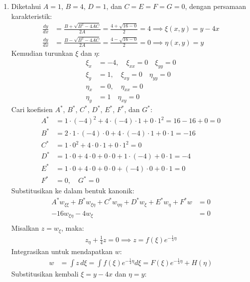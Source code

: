 \documentclass{article}
\theoremstyle{definition}
\begin{document}
\begin{enumerate}
\item Diketahui $A=1$, $B=4$, $D=1$, dan $C=E=F=G=0$, dengan persamaan karakteristik:
\begin{align*}
  \frac{dy}{dx}&=\frac{B +\sqrt{B^2 - 4AC}}{2A} = \frac{4 + \sqrt{16 - 0}}{2} = 4 \implies \xi(x,y) = y-4x \\
  \frac{dy}{dx}&=\frac{B -\sqrt{B^2 - 4AC}}{2A} = \frac{4 - \sqrt{16 - 0}}{2} = 0 \implies \eta(x,y) = y
\end{align*}
Kemudian turunkan $\xi$ dan $\eta$:
\begin{align*}
  \xi_x &= -4, \quad  \xi_{xx} = 0 \quad \xi_{yy} = 0 \\
  \xi_y &= 1, \quad  \xi_{xy} = 0 \quad \eta_{yy} = 0\\
  \eta_x &= 0, \quad \eta_{xx} = 0 \\
  \eta_y &= 1 \quad \eta_{xy} = 0
\end{align*}
Cari koefisien $A^*$, $B^*$, $C^*$, $D^*$, $E^*$, $F^*$, dan $G^*$:
\begin{align*}
A^* &= 1 \cdot (-4)^2 + 4 \cdot (-4) \cdot 1 + 0 \cdot 1^2 = 16 - 16 + 0 = 0 \\
B^* &= 2 \cdot 1 \cdot (-4) \cdot 0 + 4 \cdot (-4) \cdot 1 + 0 \cdot 1 = -16 \\
C^* &= 1 \cdot 0^2 + 4 \cdot 0 \cdot 1 + 0 \cdot 1^2 = 0 \\
D^* &= 1 \cdot 0 + 4 \cdot 0 + 0 \cdot 0 + 1 \cdot (-4) + 0 \cdot 1 = -4 \\
E^* &= 1 \cdot 0 + 4 \cdot 0 + 0 \cdot 0 + (-4) \cdot 0 + 0 \cdot 1 = 0 \\
F^* &= 0, \quad G^* = 0 
\end{align*}
Substitusikan ke dalam bentuk kanonik:
\begin{align*}
  A^* w_{\xi\xi} + B^* w_{\xi\eta} + C^* w_{\eta\eta} + D^* w_\xi + E^* w_\eta + F^* w &= 0 \\
  -16 w_{\xi\eta} - 4 w_\xi &= 0\\
\end{align*}
Misalkan $z=w_\xi$, maka:
\begin{align*}
  z_\eta + \frac{1}{4} z = 0 \implies z=f(\xi) e^{-\frac{1}{4} \eta}
\end{align*}
Integrasikan untuk mendapatkan $w$:
\begin{align*}
  w &= \int z \,d\xi= \int f(\xi) e^{-\frac{1}{4} \eta} d\xi = F(\xi) e^{-\frac{1}{4} \eta} + H(\eta) 
\end{align*}
Substitusikan kembali $\xi=y - 4x$ dan $\eta=y$:
\begin{align*}

\end{align*}
\end{enumerate}
\end{document}
